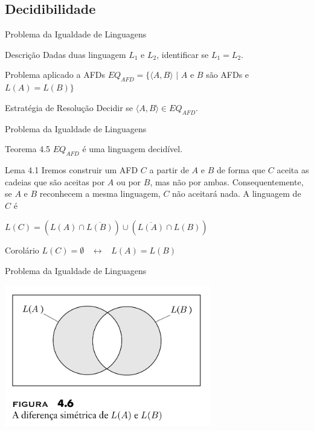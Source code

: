 \documentclass[xcolor=dvipsnames,table]{beamer}
\begin{document}
	\subsection{Decidibilidade}
	
	\begin{frame}{Problema da Igualdade de Linguagens}
		\begin{block}{Descrição}
			Dadas duas linguagem $L_1$ e $L_2$, identificar se $L_1 = L_2$.
		\end{block}	\pause
		\begin{block}{Problema aplicado a AFDs}
			$EQ_{AFD} = \{ \langle A, B \rangle \mbox{ | } A$ e $B$ são AFDs e $L(A) = L(B) \}$
		\end{block} 
		\begin{block}{Estratégia de Resolução}
			Decidir se $\langle A, B \rangle \in EQ_{AFD}$.
		\end{block}
	\end{frame}		
	
	\begin{frame}{Problema da Igualdade de Linguagens}
		\begin{block}{Teorema 4.5}
			$EQ_{AFD}$ é uma linguagem decidível.
		\end{block} 
		\begin{block}{Lema 4.1}
			Iremos construir um AFD $C$ a partir de $A$ e $B$ de forma que $C$ aceita as cadeias que são aceitas por $A$ ou por $B$, mas não por ambas. Consequentemente, se $A$ e $B$ reconhecem a mesma linguagem, $C$ não aceitará nada. A linguagem de $C$ é
			\begin{center}
				$L(C) = \left( L(A) \cap \overline{L(B)} \right) \cup \left( \overline{L(A)} \cap L(B) \right)$
			\end{center}
		\end{block} 
		\begin{block}{Corolário}
			$L(C) = \emptyset$ \ $\leftrightarrow$ \ $L(A) = L(B)$
		\end{block}
	\end{frame}
	
	\begin{frame}{Problema da Igualdade de Linguagens}
		\begin{center}
    		\includegraphics[width=9cm]{images/fig46.png}
  		\end{center}
	\end{frame}
	
\end{document}
